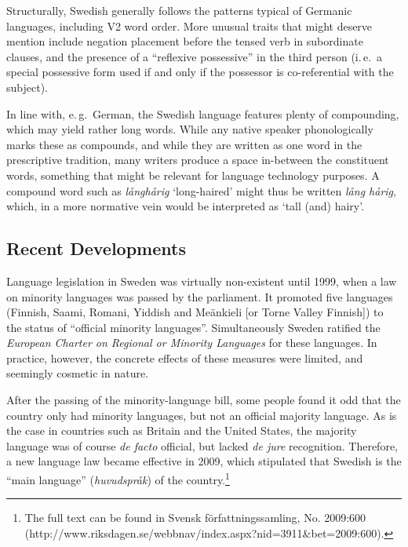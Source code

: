 \begin{multicols}{2}
Structurally, Swedish generally follows the patterns typical of
Germanic languages, including V2 word order. More unusual traits that
might deserve mention include negation placement before the tensed
verb in subordinate clauses, and the presence of a ``reflexive
possessive'' in the third person (i.\,e.~a special possessive form used
if and only if the possessor is co-referential with the subject).


In line with, e.\,g.~German, the Swedish language features plenty of
compounding, which may yield rather long words. While any native
speaker phonologically marks these as compounds, and while they are
written as one word in the prescriptive tradition, many writers
produce a space in-between the constituent words, something that might
be relevant for language technology purposes. A compound word such as
\textit{långhårig} `long-haired' might thus be written \textit{lång
  hårig}, which, in a more normative vein would be interpreted as
`tall (and) hairy'.

\subsection{Recent Developments}

Language legislation in Sweden was virtually non-existent until 1999,
when a law on minority languages was passed by the parliament. It
promoted five languages (Finnish, Saami, Romani, Yiddish and Meänkieli
[or Torne Valley Finnish]) to the status of ``official minority
languages''. Simultaneously Sweden ratified the \textit{European
  Charter on Regional or Minority Languages} for these languages. In
practice, however, the concrete effects of these measures were
limited, and seemingly cosmetic in nature.

After the passing of the minority-language bill, some people found it
odd that the country only had minority languages, but not an official
majority language. As is the case in countries such as Britain and the
United States, the majority language was of course \textit{de facto}
official, but lacked \textit{de jure} recognition. Therefore, a new
language law became effective in 2009, which stipulated that Swedish
is the ``main language'' (\textit{huvudspråk}) of the
country.\footnote{The full text can be found in Svensk
  författningssamling, No. 2009:600
  \\(http://www.riksdagen.se/webbnav/index.aspx?nid=3911\&bet=2009:600).}


\end{multicols}
